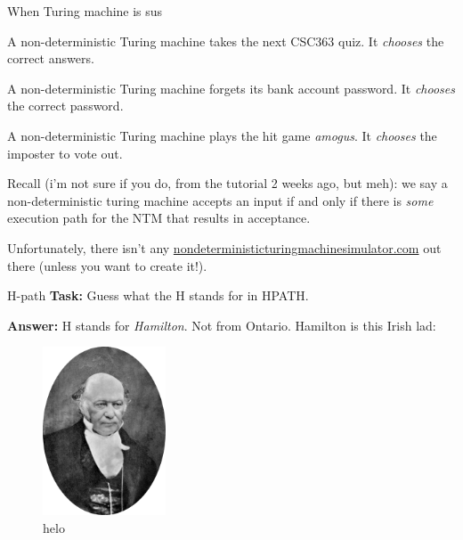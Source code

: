 \documentclass{beamer}
\begin{document}
\begin{frame}{When Turing machine is sus \emojiflushed \emojiflushed}

A non-deterministic Turing machine takes the next CSC363 quiz. It \textit{chooses} the correct answers.

\vspace{2mm}

A non-deterministic Turing machine forgets its bank account password. It \textit{chooses} the correct password.

\vspace{2mm}

A non-deterministic Turing machine plays the hit game \textit{amogus}. It \textit{chooses} the imposter to vote out.

\vspace{2mm}

\pause

Recall (i'm not sure if you do, from the tutorial 2 weeks ago, but meh): we say a non-deterministic turing machine accepts an input if and only if there is \textit{some} execution path for the NTM that results in acceptance.

\vspace{2mm}

Unfortunately, there isn't any \url{nondeterministicturingmachinesimulator.com} out there (unless you want to create it!). 

\end{frame}

\begin{frame}{H-path}
\textbf{Task:} Guess what the H stands for in HPATH. 
\pause

\textbf{Answer:} H stands for \textit{Hamilton}. Not from Ontario. Hamilton is this Irish lad:

\begin{figure}[h]
\centering
\includegraphics[height=5cm]{img/hamilton.png}
\caption*{helo}
\end{figure}


\end{frame}
\end{document}
